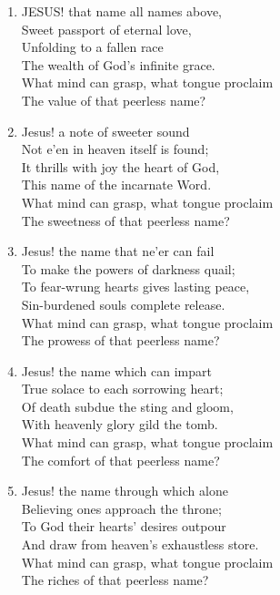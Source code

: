 \begin{enumerate}
    \item JESUS! that name all names above, \\
        Sweet passport of eternal love, \\
        Unfolding to a fallen race \\
        The wealth of God's infinite grace. \\
        What mind can grasp, what tongue proclaim \\
        The value of that peerless name?

    \item Jesus! a note of sweeter sound \\
        Not e'en in heaven itself is found; \\
        It thrills with joy the heart of God, \\
        This name of the incarnate Word. \\
        What mind can grasp, what tongue proclaim \\
        The sweetness of that peerless name?

    \item Jesus! the name that ne'er can fail \\
        To make the powers of darkness quail; \\
        To fear-wrung hearts gives lasting peace, \\
        Sin-burdened souls complete release. \\
        What mind can grasp, what tongue proclaim \\
        The prowess of that peerless name?

    \item Jesus! the name which can impart \\
        True solace to each sorrowing heart; \\
        Of death subdue the sting and gloom, \\
        With heavenly glory gild the tomb. \\
        What mind can grasp, what tongue proclaim \\
        The comfort of that peerless name?

    \item Jesus! the name through which alone \\
        Believing ones approach the throne; \\
        To God their hearts' desires outpour \\
        And draw from heaven's exhaustless store. \\
        What mind can grasp, what tongue proclaim \\
        The riches of that peerless name?


\end{enumerate}
